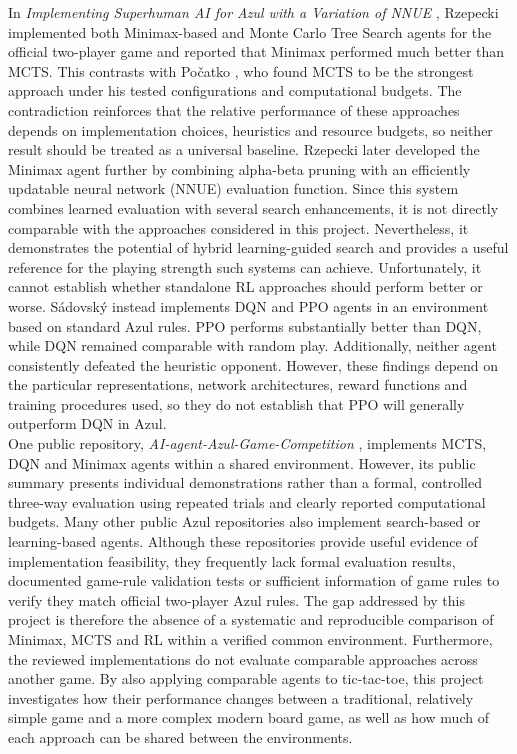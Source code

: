 In \emph{Implementing Superhuman AI for Azul with a Variation of NNUE} \cite{rzepecki2025azul}, Rzepecki implemented both Minimax-based and Monte Carlo Tree Search agents for the official two-player game and reported that Minimax performed much better than MCTS. This contrasts with Počatko \cite{pocatko2021azul}, who found MCTS to be the strongest approach under his tested configurations and computational budgets. The contradiction reinforces that the relative performance of these approaches depends on implementation choices, heuristics and resource budgets, so neither result should be treated as a universal baseline. Rzepecki later developed the Minimax agent further by combining alpha-beta pruning with an efficiently updatable neural network (NNUE) evaluation function. Since this system combines learned evaluation with several search enhancements, it is not directly comparable with the approaches considered in this project. Nevertheless, it demonstrates the potential of hybrid learning-guided search and provides a useful reference for the playing strength such systems can achieve. Unfortunately, it cannot establish whether standalone RL approaches should perform better or worse. Sádovský \cite{sadovsky2025azul} instead implements DQN and PPO agents in an environment based on standard Azul rules. PPO performs substantially better than DQN, while DQN remained comparable with random play. Additionally, neither agent consistently defeated the heuristic opponent. However, these findings depend on the particular representations, network architectures, reward functions and training procedures used, so they do not establish that PPO will generally outperform DQN in Azul. \\

One public repository, \emph{AI-agent-Azul-Game-Competition} \cite{kaiyooazulcompetition}, implements MCTS, DQN and Minimax agents within a shared environment. However, its public summary presents individual demonstrations rather than a formal, controlled three-way evaluation using repeated trials and clearly reported computational budgets. Many other public Azul repositories \cite{mgsweetazulmcts, domwilsonazul, azulai, azulrl} also implement search-based or learning-based agents. Although these repositories provide useful evidence of implementation feasibility, they frequently lack formal evaluation results, documented game-rule validation tests or sufficient information of game rules to verify they match official two-player Azul rules. The gap addressed by this project is therefore the absence of a systematic and reproducible comparison of Minimax, MCTS and RL within a verified common environment. Furthermore, the reviewed implementations do not evaluate comparable approaches across another game. By also applying comparable agents to tic-tac-toe, this project investigates how their performance changes between a traditional, relatively simple game and a more complex modern board game, as well as how much of each approach can be shared between the environments.

